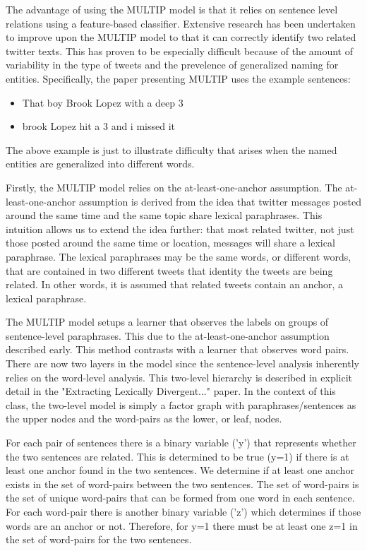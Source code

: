 \documentclass[conference]{IEEEtran}
\begin{document}
The advantage of using the MULTIP model is that it relies on sentence level relations using a feature-based classifier. Extensive research has been undertaken to improve upon the MULTIP model to that it can correctly identify two related twitter texts. This has proven to be especially difficult because of the amount of variability in the type of tweets and the prevelence of generalized naming for entities. Specifically, the paper presenting MULTIP uses the example sentences:\medskip

\begin{itemize}
\item That boy Brook Lopez with a deep 3
\item brook Lopez hit a 3 and i missed it
\end{itemize}

\medskip The above example is just to illustrate difficulty that arises when the named entities are generalized into different words. \medskip

Firstly, the MULTIP model relies on the at-least-one-anchor assumption. The at-least-one-anchor assumption is derived from the idea that twitter messages posted around the same time and the same topic share lexical paraphrases. This intuition allows us to extend the idea further: that most related twitter, not just those posted around the same time or location, messages will share a lexical paraphrase. The lexical paraphrases may be the same words, or different words, that are contained in two different tweets that identity the tweets are being related. In other words, it is assumed that related tweets contain an anchor, a lexical paraphrase.\medskip

The MULTIP model setups a learner that observes the labels on groups of sentence-level paraphrases. This due to the at-least-one-anchor assumption described early. This method contrasts with a learner that observes word pairs. There are now two layers in the model since the sentence-level analysis inherently relies on the word-level analysis. This two-level hierarchy is described in explicit detail in the "Extracting Lexically Divergent..." paper. In the context of this class, the two-level model is simply a factor graph with paraphrases/sentences as the upper nodes and the word-pairs as the lower, or leaf, nodes.\medskip

For each pair of sentences there is a binary variable ('y') that represents whether the two sentences are related. This is determined to be true (y=1) if there is at least one anchor found in the two sentences. We determine if at least one anchor exists in the set of word-pairs between the two sentences. The set of word-pairs is the set of unique word-pairs that can be formed from one word in each sentence. For each word-pair there is another binary variable ('z') which determines if those words are an anchor or not. Therefore, for y=1 there must be at least one z=1 in the set of word-pairs for the two sentences.  \medskip
\end{document}
